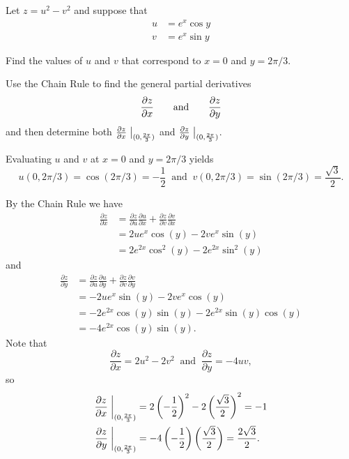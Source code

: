 \begin{exercises}
\begin{exerciseSolution}
\ea

\end{exerciseSolution}

\item Let $z = u^2 - v^2$ and suppose that
    \begin{align*}
      u & = e^x\cos y \\
      v & = e^x\sin y
    \end{align*}
    
    \ba
      \item Find the values of $u$ and $v$ that correspond to $x=0$ and $y=2\pi/3$.
      \item Use the Chain Rule to find the general partial derivatives
        $$
        \frac{\partial z}{\partial x}
        \hspace*{20pt}
        \mbox{and}
        \hspace*{20pt}
        \frac{\partial z}{\partial y}
        $$
        and then determine both $\frac{\partial z}{\partial x}\bigm|_{(0, \frac{2\pi}{3})}$ and $\frac{\partial z}{\partial y}\bigm|_{(0, \frac{2\pi}{3})}$.
     \ea

\begin{exerciseSolution}
    \ba
      \item Evaluating $u$ and $v$ at $x=0$ and $y=2\pi/3$ yields
\[u(0,2\pi/3) = \cos(2\pi/3) = -\frac{1}{2} \ \text{ and } \ v(0,2\pi/3) = \sin(2\pi/3) = \frac{\sqrt{3}}{2}.\]
      \item By the Chain Rule we have
\begin{align*}
\frac{\partial z}{\partial x} &= \frac{\partial z}{\partial u} \frac{\partial u}{\partial x} + \frac{\partial z}{\partial v} \frac{\partial v}{\partial x} \\
	&= 2ue^x\cos(y) -2ve^x \sin(y) \\
	&= 2e^{2x}\cos^2(y) - 2e^{2x}\sin^2(y)
\end{align*}
and
\begin{align*}
\frac{\partial z}{\partial y} &= \frac{\partial z}{\partial u} \frac{\partial u}{\partial y} + \frac{\partial z}{\partial v} \frac{\partial v}{\partial y} \\
	&= -2ue^x\sin(y) -2ve^x \cos(y) \\
	&= -2e^{2x}\cos(y)\sin(y) - 2e^{2x}\sin(y)\cos(y) \\
	&= -4e^{2x}\cos(y) \sin(y).
\end{align*}
Note that 
\[\frac{\partial z}{\partial x} = 2u^2-2v^2 \ \text{ and } \ \frac{\partial z}{\partial y} = -4uv,\]
so
\begin{align*}
\frac{\partial z}{\partial x}\biggm|_{(0, \frac{2\pi}{3})} &= 2\left(-\frac{1}{2}\right)^2 -2\left(\frac{\sqrt{3}}{2}\right)^2 = -1 \\
\frac{\partial z}{\partial y}\biggm|_{(0, \frac{2\pi}{3})} &= -4\left(-\frac{1}{2}\right)\left(\frac{\sqrt{3}}{2}\right) = \frac{2\sqrt{3}}{2}.
\end{align*}
     \ea
\end{exerciseSolution}
        

\end{exercises}

